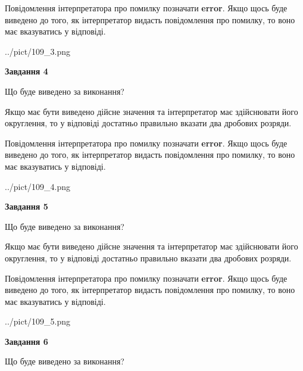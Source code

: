 \documentclass[12pt, ukrainian]{article}
\begin{document}
{\begin {Large}
Повідомлення інтерпретатора про помилку позначати \textbf{error}.
Якщо щось буде виведено до того, як інтерпретатор видасть повідомлення про помилку, 
то воно має вказуватись у відповіді. \par

\begin{center}
	{../pict/109_3.png}
\end{center}
\newpage

{\begin {center}\textbf{Завдання 4}\end {center}}\par
Що буде виведено за виконання? \par

Якщо має бути виведено дійсне значення та інтерпретатор має здійснювати його округлення, 
то у відповіді достатньо правильно вказати два дробових розряди.

Повідомлення інтерпретатора про помилку позначати \textbf{error}.
Якщо щось буде виведено до того, як інтерпретатор видасть повідомлення про помилку, 
то воно має вказуватись у відповіді. \par

\begin{center}
	{../pict/109_4.png}
\end{center}
\newpage

{\begin {center}\textbf{Завдання 5}\end {center}}\par
Що буде виведено за виконання? \par

Якщо має бути виведено дійсне значення та інтерпретатор має здійснювати його округлення, 
то у відповіді достатньо правильно вказати два дробових розряди.

Повідомлення інтерпретатора про помилку позначати \textbf{error}.
Якщо щось буде виведено до того, як інтерпретатор видасть повідомлення про помилку, 
то воно має вказуватись у відповіді. \par

\begin{center}
	{../pict/109_5.png}
\end{center}
\newpage

{\begin {center}\textbf{Завдання 6}\end {center}}\par
Що буде виведено за виконання? \par


\end{Large}}
\end{document}
